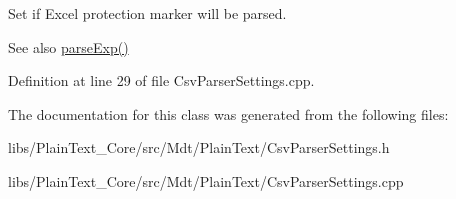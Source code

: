 Set if Excel protection marker will be parsed. 

\begin{DoxySeeAlso}{See also}
\hyperlink{class_mdt_1_1_plain_text_1_1_csv_parser_settings_af40bd9b66e5bec47230ece1cba3ee16a}{parse\+Exp()} 
\end{DoxySeeAlso}


Definition at line 29 of file Csv\+Parser\+Settings.\+cpp.



The documentation for this class was generated from the following files\+:\begin{DoxyCompactItemize}
\item 
libs/\+Plain\+Text\+\_\+\+Core/src/\+Mdt/\+Plain\+Text/Csv\+Parser\+Settings.\+h\item 
libs/\+Plain\+Text\+\_\+\+Core/src/\+Mdt/\+Plain\+Text/Csv\+Parser\+Settings.\+cpp\end{DoxyCompactItemize}
